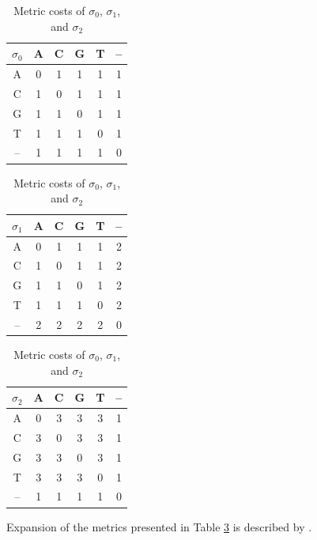 \documentclass{bmcart}
\begin{document}
\begin{backmatter}
    \begin{table}[!hbt]
    	\caption{Metric costs of $\sigma_0$, $\sigma_1$, and $\sigma_2$}
    	\label{Tab:Metrics}
    	\begin{minipage}{0.3\textwidth}
    		\centering
    		\begin{tabular}{c|ccccc}
    			$\sigma_0$ & A & C & G & T & -- \\ \hline
    			A  & 0 & 1 & 1 & 1 & 1  \\
    			C  & 1 & 0 & 1 & 1 & 1  \\
    			G  & 1 & 1 & 0 & 1 & 1  \\
    			T  & 1 & 1 & 1 & 0 & 1  \\
    			-- & 1 & 1 & 1 & 1 & 0
    		\end{tabular}
    	\end{minipage}
    	\hfill
    	\begin{minipage}{0.33\textwidth}
    		\centering
    		\begin{tabular}{c|ccccc}
    			$\sigma_1$ & A & C & G & T & -- \\ \hline
    			A  & 0 & 1 & 1 & 1 & 2  \\
    			C  & 1 & 0 & 1 & 1 & 2  \\
    			G  & 1 & 1 & 0 & 1 & 2  \\
    			T  & 1 & 1 & 1 & 0 & 2  \\
    			-- & 2 & 2 & 2 & 2 & 0
    		\end{tabular}
    	\end{minipage}
    	\hfill
    	\begin{minipage}{0.3\textwidth}
    		\centering
    		\begin{tabular}{c|ccccc}
    			$\sigma_2$ & A & C & G & T & -- \\ \hline
    			A  & 0 & 3 & 3 & 3 & 1  \\
    			C  & 3 & 0 & 3 & 3 & 1  \\
    			G  & 3 & 3 & 0 & 3 & 1  \\
    			T  & 3 & 3 & 3 & 0 & 1  \\
    			-- & 1 & 1 & 1 & 1 & 0
    		\end{tabular}
    	\end{minipage}\par
        \vspace{0.75em}\raggedright
        Expansion of the metrics presented in Table \ref{Tab:Metrics} is described by \cite{VaronandWheeler2012}.
    \end{table}
    

\end{backmatter}
\end{document}
